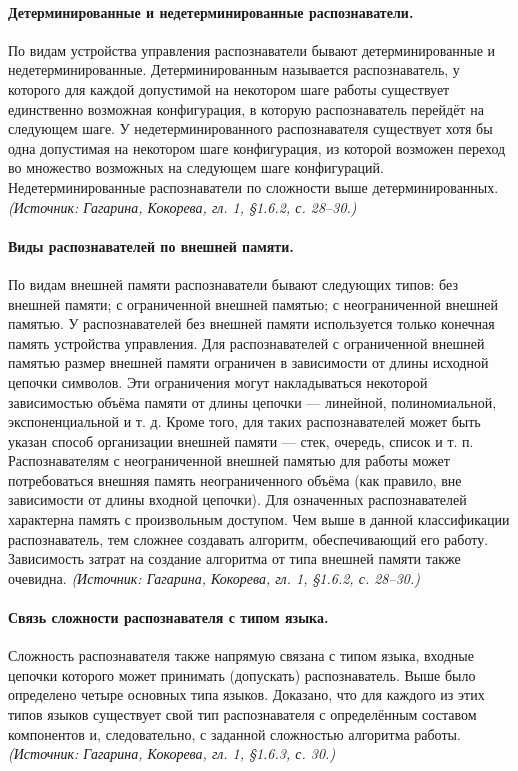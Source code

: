 \documentclass[a4paper,12pt]{article}
\begin{document}
\paragraph{Детерминированные и недетерминированные распознаватели.}
По видам устройства управления распознаватели бывают детерминированные и недетерминированные. Детерминированным называется распознаватель, у которого для каждой допустимой на некотором шаге работы существует единственно возможная конфигурация, в которую распознаватель перейдёт на следующем шаге. У недетерминированного распознавателя существует хотя бы одна допустимая на некотором шаге конфигурация, из которой возможен переход во множество возможных на следующем шаге конфигураций. Недетерминированные распознаватели по сложности выше детерминированных.
\textit{(Источник: Гагарина, Кокорева, гл. 1, §1.6.2, с. 28--30.)}

\paragraph{Виды распознавателей по внешней памяти.}
По видам внешней памяти распознаватели бывают следующих типов: без внешней памяти; с ограниченной внешней памятью; с неограниченной внешней памятью. У распознавателей без внешней памяти используется только конечная память устройства управления. Для распознавателей с ограниченной внешней памятью размер внешней памяти ограничен в зависимости от длины исходной цепочки символов. Эти ограничения могут накладываться некоторой зависимостью объёма памяти от длины цепочки — линейной, полиномиальной, экспоненциальной и т. д. Кроме того, для таких распознавателей может быть указан способ организации внешней памяти — стек, очередь, список и т. п. Распознавателям с неограниченной внешней памятью для работы может потребоваться внешняя память неограниченного объёма (как правило, вне зависимости от длины входной цепочки). Для означенных распознавателей характерна память с произвольным доступом. Чем выше в данной классификации распознаватель, тем сложнее создавать алгоритм, обеспечивающий его работу. Зависимость затрат на создание алгоритма от типа внешней памяти также очевидна.
\textit{(Источник: Гагарина, Кокорева, гл. 1, §1.6.2, с. 28--30.)}

\paragraph{Связь сложности распознавателя с типом языка.}
Сложность распознавателя также напрямую связана с типом языка, входные цепочки которого может принимать (допускать) распознаватель. Выше было определено четыре основных типа языков. Доказано, что для каждого из этих типов языков существует свой тип распознавателя с определённым составом компонентов и, следовательно, с заданной сложностью алгоритма работы.
\textit{(Источник: Гагарина, Кокорева, гл. 1, §1.6.3, с. 30.)}
\end{document}
